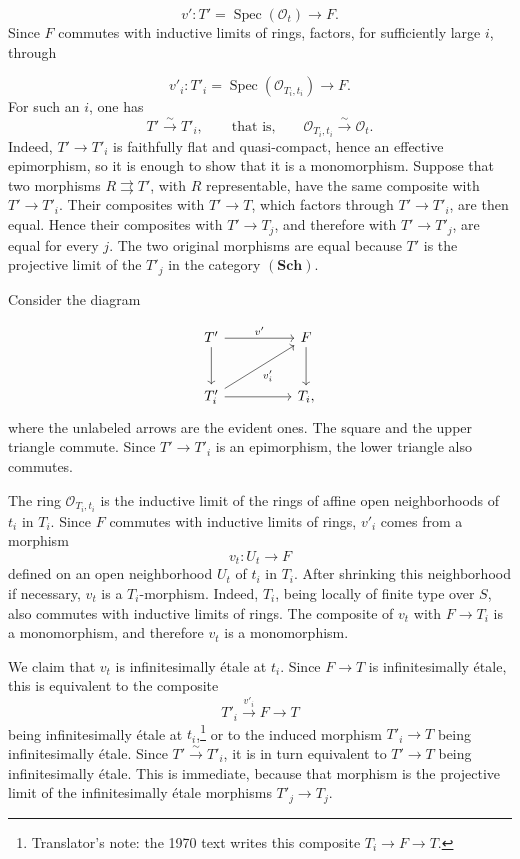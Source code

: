 \[
  v':T'=\operatorname{Spec}(\mathscr O_t)\longrightarrow F.
\]
Since \(F\) commutes with inductive limits of rings, 
factors, for sufficiently large \(i\), through

\[
  v'_i:T'_i=\operatorname{Spec}(\mathscr O_{T_i,t_i})
  \longrightarrow F.
\]
For such an \(i\), one has
\[
  T'\xrightarrow{\sim}T'_i,
  \qquad\text{that is,}\qquad
  \mathscr O_{T_i,t_i}\xrightarrow{\sim}\mathscr O_t.
\]
Indeed, \(T'\to T'_i\) is faithfully flat and quasi-compact, hence an
effective epimorphism, so it is enough to show that it is a
monomorphism.  Suppose that two morphisms \(R\rightrightarrows T'\),
with \(R\) representable, have the same composite with
\(T'\to T'_i\).  Their composites with \(T'\to T\), which factors
through \(T'\to T'_i\), are then equal.  Hence their composites with
\(T'\to T_j\), and therefore with \(T'\to T'_j\), are equal for
every \(j\).  The two original morphisms are equal because \(T'\) is
the projective limit of the \(T'_j\) in the category
\((\mathbf{Sch})\).

Consider the diagram

\[
\begin{tikzcd}[column sep=huge,row sep=large]
  T' \arrow[r,"v'"] \arrow[d] & F \arrow[d] \\
  T'_i \arrow[r] \arrow[ur,"v'_i"'] & T_i ,
\end{tikzcd}
\]
where the unlabeled arrows are the evident ones.  The square and the
upper triangle commute.  Since \(T'\to T'_i\) is an epimorphism, the
lower triangle also commutes.

The ring \(\mathscr O_{T_i,t_i}\) is the inductive limit of the rings
of affine open neighborhoods of \(t_i\) in \(T_i\).  Since \(F\)
commutes with inductive limits of rings, \(v'_i\) comes from a
morphism
\[
  v_t:U_t\longrightarrow F
\]
defined on an open neighborhood \(U_t\) of \(t_i\) in \(T_i\).
After shrinking this neighborhood if necessary, \(v_t\) is a
\(T_i\)-morphism.  Indeed, \(T_i\), being locally of finite type over
\(S\), also commutes with inductive limits of rings.  The composite of
\(v_t\) with \(F\to T_i\) is a monomorphism, and therefore \(v_t\) is
a monomorphism.

We claim that \(v_t\) is infinitesimally étale at \(t_i\).  Since
\(F\to T\) is infinitesimally étale, this is equivalent to the
composite
\[
  T'_i\xrightarrow{v'_i}F\longrightarrow T
\]
being infinitesimally étale at \(t_i\),\footnote{Translator's note: the 1970 text writes this
composite \(T_i\to F\to T\).} or to the induced morphism
\(T'_i\to T\) being infinitesimally étale.  Since
\(T'\xrightarrow{\sim}T'_i\), it is in turn equivalent to
\(T'\to T\) being infinitesimally étale.  This is immediate, because
that morphism is the projective limit of the infinitesimally étale
morphisms \(T'_j\to T_j\).

